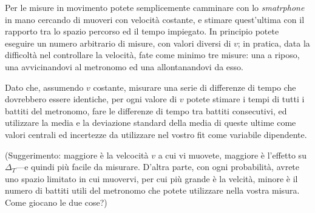 \documentclass{lab1-article}
\begin{document}
\begin{article}
\secconsiderations

Per le misure in movimento potete semplicemente camminare con lo \emph{smatrphone}
in mano cercando di muoveri con velocit\`a costante, e stimare quest'ultima
con il rapporto tra lo spazio percorso ed il tempo impiegato. In principio
potete eseguire un numero arbitrario di misure, con valori diversi di $v$; in
pratica, data la difficolt\`a nel controllare la velocit\`a, fate come minimo
tre misure: una a riposo, una avvicinandovi al metronomo ed una allontanandovi da
esso.

Dato che, assumendo $v$ costante, misurare una serie di differenze di tempo
che dovrebbero essere identiche, per ogni valore di $v$ potete stimare i tempi
di tutti i battiti del metronomo, fare le differenze di tempo tra battiti
consecutivi, ed utilizzare la media e la deviazione standard della media di
queste ultime come valori centrali ed incertezze da utilizzare nel vostro fit
come variabile dipendente.

(Suggerimento: maggiore \`e la velcocit\`a $v$ a cui vi muovete, maggiore \`e
l'effetto su $\Delta_T$---e quindi pi\`u facile da misurare. D'altra parte, con
ogni probabilit\`a, avrete uno spazio limitato in cui muovervi, per cui
pi\`u grande \`e la velcit\`a, minore \`e il numero di battiti utili del
metronomo che potete utilizzare nella vostra misura. Come giocano le due cose?)


\end{article}
\end{document}
